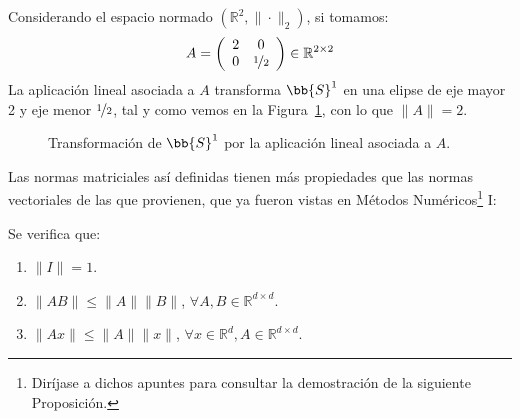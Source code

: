 \begin{ejemplo}
    Considerando el espacio normado $(\mathbb{R}^2, \|\cdot \|_2)$, si tomamos:
    \begin{equation*}
        A = \left(\begin{array}{cc}
                2 & 0 \\
                0 & \nicefrac{1}{2}
        \end{array}\right) \in \mathbb{R}^{2\times 2}
    \end{equation*}
    La aplicación lineal asociada a $A$ transforma $\bb{S}^1$ en una elipse de eje mayor 2 y eje menor $\nicefrac{1}{2}$, tal y como vemos en la Figura~\ref{fig:S1_fA}, con lo que $\|A\| = 2$.

    \begin{figure}[H]
        \centering
{}        
\caption{Transformación de $\bb{S}^1$ por la aplicación lineal asociada a $A$.}
\label{fig:S1_fA}
    \end{figure}
\end{ejemplo}

\noindent
Las normas matriciales así definidas tienen más propiedades que las normas vectoriales de las que provienen, que ya fueron vistas en Métodos Numéricos\footnote{Diríjase a dichos apuntes para consultar la demostración de la siguiente Proposición.} I\@:
\begin{prop}
    Se verifica que:
    \begin{enumerate}
        \item $\|I\| = 1$.
        \item $\|AB\| \leq \|A\|\|B\|$, $\forall A,B\in \mathbb{R}^{d\times d}$.
        \item $\|Ax\| \leq \|A\|\|x\|$, $\forall x\in \mathbb{R}^d, A\in \mathbb{R}^{d\times d}$.
    \end{enumerate}
\end{prop}

